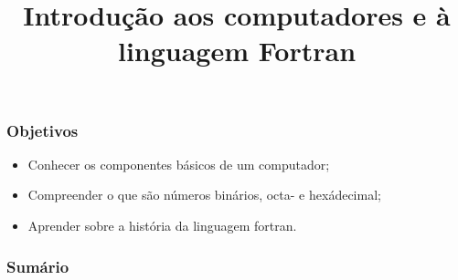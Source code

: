 \title{Introdução aos computadores e à linguagem Fortran}
\begin{frame}
\maketitle
\end{frame}
\begin{frame}
\frametitle{Objetivos}
\begin{itemize}
  \item Conhecer os componentes básicos de um computador;
  \item Compreender o que são números binários, octa- e hexádecimal;
  \item Aprender sobre a história da linguagem fortran.
\end{itemize}
\nocite{Chapman2018}
\printbibliography[title = Referências]
\end{frame}
\begin{frame}
\frametitle{Sumário}
\tableofcontents
\end{frame}
